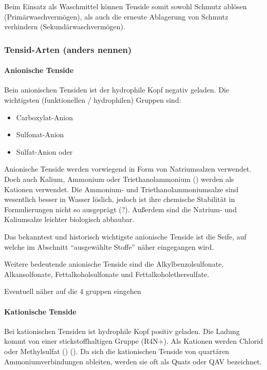 \documentclass[main.tex]{subfiles}
\begin{document}
Beim Einsatz als Waschmittel können Tenside somit sowohl Schmutz ablösen \\ (Primärwaschvermögen), als auch die erneute Ablagerung von Schmutz verhindern (Sekundärwaschvermögen).

\subsubsection{Tensid-Arten (anders nennen)}

\paragraph{Anionische Tenside}

Bein anionischen Tensiden ist der hydrophile Kopf negativ geladen. Die wichtigsten (funktionellen / hydrophilen) Gruppen sind:

\begin{itemize}
	\item Carboxylat-Anion 
	\item Sulfonat-Anion 
	\item Sulfat-Anion  oder 
\end{itemize}

Anionische Tenside werden vorwiegend in Form von Natriumsalzen verwendet. Doch auch Kalium, Ammonium oder Triethanolammonium () werden als Kationen verwendet. Die Ammonium- und Triethanolammoniumsalze sind wesentlich besser in Wasser löslich, jedoch ist ihre chemische Stabilität in Formulierungen nicht so ausgeprägt (?). Außerdem sind die Natrium- und Kaliumsalze leichter biologisch abbaubar.

Das bekanntest und historisch wichtigste anionische Tenside ist die Seife, auf welche im Abschnitt "`ausgewählte Stoffe"' näher eingegangen wird.

Weitere bedeutende anionische Tenside sind die Alkylbenzolsulfonate, Alkansolfonate, Fettalkoholsulfonate und Fettalkoholethersulfate.

Eventuell näher auf die 4 gruppen eingehen

\paragraph{Kationische Tenside}

Bei kationischen Tensiden ist hydrophile Kopf positiv geladen. Die Ladung kommt von einer stickstoffhaltigen Gruppe (R4N+). Als Kationen werden Chlorid oder Methylsulfat () (). Da sich die kationischen Tenside von quartären Ammoniumverbindungen ableiten, werden sie oft als Quats oder QAV bezeichnet.
\end{document}
